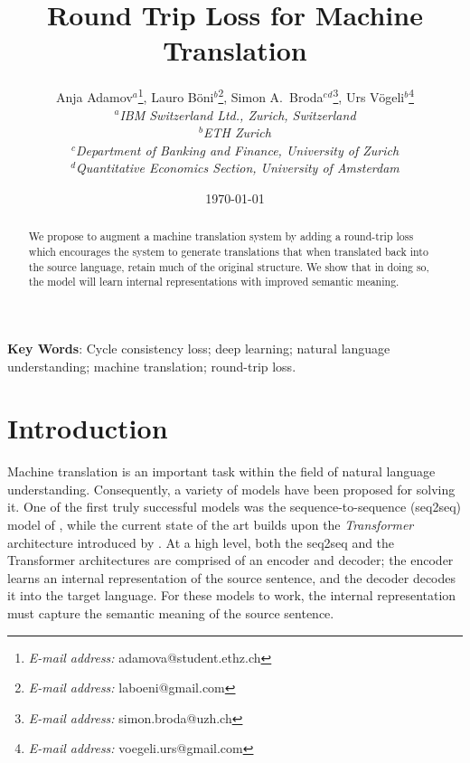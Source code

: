 \documentclass[11pt,a4paper]{article}
\begin{document}
\title{Round Trip Loss for Machine Translation}
\date{\today}
\author{
Anja Adamov$\mbox{}^a$\thanks{\emph{E-mail address:} adamova@student.ethz.ch},
Lauro B\"{o}ni$\mbox{}^b$\thanks{\emph{E-mail address:} laboeni@gmail.com},
Simon A.\ Broda$\mbox{}^c\mbox{}^d$\thanks{\emph{E-mail address:} simon.broda@uzh.ch},
Urs V\"{o}geli$\mbox{}^b$\thanks{\emph{E-mail address:} voegeli.urs@gmail.com}
\medskip \\
\textit{\small $\mbox{}^a$IBM Switzerland Ltd., Zurich, Switzerland}
\medskip \\
\textit{\small $\mbox{}^b$ETH Zurich}
\medskip \\
\textit{\small $\mbox{}^c$Department of Banking and Finance, University of Zurich}
\medskip \\
\textit{\small $\mbox{}^d$Quantitative Economics Section, University of Amsterdam}
}
\maketitle \setcounter{page}{0}\thispagestyle{empty}
\begin{abstract}
We propose to augment a machine translation system by adding a round-trip loss which encourages the system to generate translations that when translated back into the source language, retain much of the original structure. We show that in doing so, the model will learn internal representations with improved semantic meaning.
\end{abstract}
\bigskip \textbf{Key Words}: Cycle consistency loss; deep learning; natural language understanding; machine translation; round-trip loss.
\newpage
\setcounter{page}{1}
\section{Introduction}
Machine translation is an important task within the field of natural language understanding. Consequently, a variety of models have been proposed for solving it. One of the first truly successful models was the sequence-to-sequence (seq2seq) model of \citet{seq2seq}, while the current state of the art builds upon the \emph{Transformer} architecture introduced by \citet{transformer}. At a high level, both the seq2seq and the Transformer architectures are comprised of an encoder and decoder; the encoder learns an internal representation of the source sentence, and the decoder decodes it into the target language. For these models to work, the internal representation must capture the semantic meaning of the source sentence.
\end{document}
